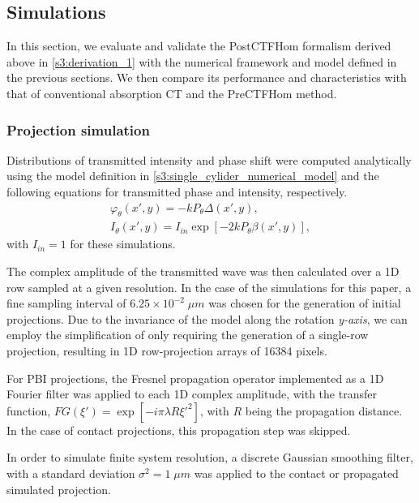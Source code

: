 \documentclass[twocolumn, switch]{article} %
\begin{document}
\subsection{Simulations} \label{s3:simulations}

In this section, we evaluate and validate the PostCTFHom formalism derived above in \cref{s3:derivation_1} with the numerical framework and model defined in the previous sections. We then compare its performance and characteristics with that of conventional absorption CT and the PreCTFHom method. 

\subsubsection{Projection simulation} \label{s3:projection_simulation}

Distributions of transmitted intensity and phase shift were computed analytically using the model definition in \cref{s3:single_cylider_numerical_model} and the following equations for transmitted phase and intensity, respectively.
\begin{align*}
{\varphi _\theta }(x',y) =  - k{P_\theta }\Delta (x',y), \\
{I_\theta }(x',y) = {I_{in}}\exp \left[ { - 2k{P_\theta }\beta (x',y)}\right],
\end{align*}
with $I_{in} = 1$ for these simulations.

The complex amplitude of the transmitted wave was then calculated over a 1D row sampled at a given resolution. In the case of the simulations for this paper, a fine sampling interval of $6.25\times 10^{-2}\;\mu m$ was chosen for the generation of initial projections. Due to the invariance of the model along the rotation \textit{y-axis}, we can employ the simplification of only requiring the generation of a single-row projection, resulting in 1D row-projection arrays of 16384 pixels.

For PBI projections, the Fresnel propagation operator \cite{Paganin2006CoherentOptics} implemented as a 1D Fourier filter was applied to each 1D complex amplitude, with the transfer function, $FG\left( {\xi '} \right) = \exp [-i\pi \lambda R{\xi '^2}]$, with $R$ being the propagation distance. In the case of contact projections, this propagation step was skipped.

In order to simulate finite system resolution, a discrete Gaussian smoothing filter, with a standard deviation ${\sigma^2} = 1\;\mu m$ was applied to the contact or propagated simulated projection.
\end{document}
